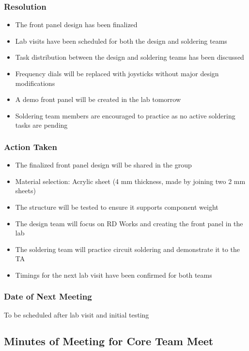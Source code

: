 \documentclass[12pt,a4paper]{article}
\begin{document}
\subsubsection*{Resolution}
\begin{itemize}
    \item The front panel design has been finalized
    \item Lab visits have been scheduled for both the design and soldering teams
    \item Task distribution between the design and soldering teams has been discussed
    \item Frequency dials will be replaced with joysticks without major design modifications
    \item A demo front panel will be created in the lab tomorrow
    \item Soldering team members are encouraged to practice as no active soldering tasks are pending
\end{itemize}

\subsubsection*{Action Taken}
\begin{itemize}
    \item The finalized front panel design will be shared in the group
    \item Material selection: Acrylic sheet (4 mm thickness, made by joining two 2 mm sheets)
    \item The structure will be tested to ensure it supports component weight
    \item The design team will focus on RD Works and creating the front panel in the lab
    \item The soldering team will practice circuit soldering and demonstrate it to the TA
    \item Timings for the next lab visit have been confirmed for both teams
\end{itemize}

\subsubsection*{Date of Next Meeting}
To be scheduled after lab visit and initial testing

\subsection*{Minutes of Meeting for Core Team Meet}
\end{document}
